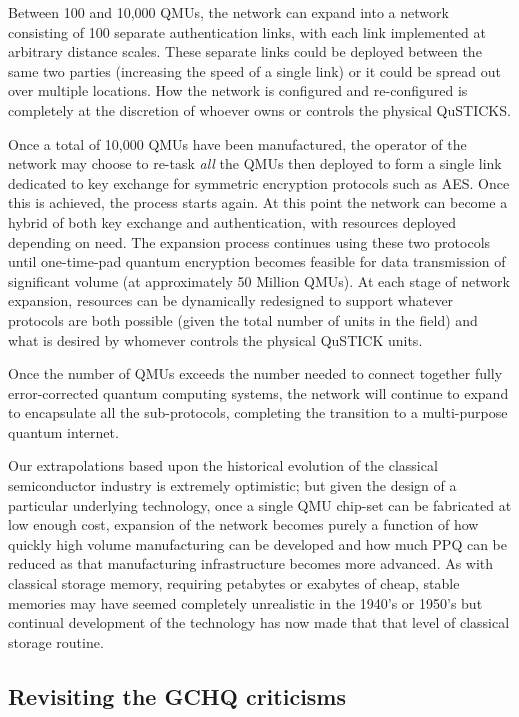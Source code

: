 \documentclass[twocolumn, aps, rmp, amsmath, amssymb, nofootinbib, superscriptaddress, longbibliography, floatfix, table-of-contents, eqsecnum]{revtex4-2}
\begin{document}
Between 100 and 10,000 QMUs, the network can expand into a network consisting of 100 separate authentication links, with each link implemented at arbitrary distance scales. These separate links could be deployed between the same two parties (increasing the speed of a single link) or it could be spread out over multiple locations. How the network is configured and re-configured is completely at the discretion of whoever owns or controls the physical QuSTICKS. 

Once a total of 10,000 QMUs have been manufactured, the operator of the network may choose to re-task \textit{all} the QMUs then deployed to form a single link dedicated to key exchange for symmetric encryption protocols such as AES. Once this is achieved, the process starts again. At this point the network can become a hybrid of both key exchange and authentication, with resources deployed depending on need. The expansion process continues using these two protocols until one-time-pad quantum encryption becomes feasible for data transmission of significant volume (at approximately 50 Million QMUs). At each stage of network expansion, resources can be dynamically redesigned to support whatever protocols are both possible (given the total number of units in the field) and what is desired by whomever controls the physical QuSTICK units. 

Once the number of QMUs exceeds the number needed to connect together fully error-corrected quantum computing systems, the network will continue to expand to encapsulate all the sub-protocols, completing the transition to a multi-purpose quantum internet. 

Our extrapolations based upon the historical evolution of the classical semiconductor industry is extremely optimistic; but given the design of a particular underlying technology, once a single QMU chip-set can be fabricated at low enough cost, expansion of the network becomes purely a function of how quickly high volume manufacturing can be developed and how much PPQ can be reduced as that manufacturing infrastructure becomes more advanced. As with classical storage memory, requiring petabytes or exabytes of cheap, stable memories may have seemed completely unrealistic in the 1940's or 1950's but continual development of the technology has now made that that level of classical storage routine.

\subsection{Revisiting the GCHQ criticisms}
\end{document}
